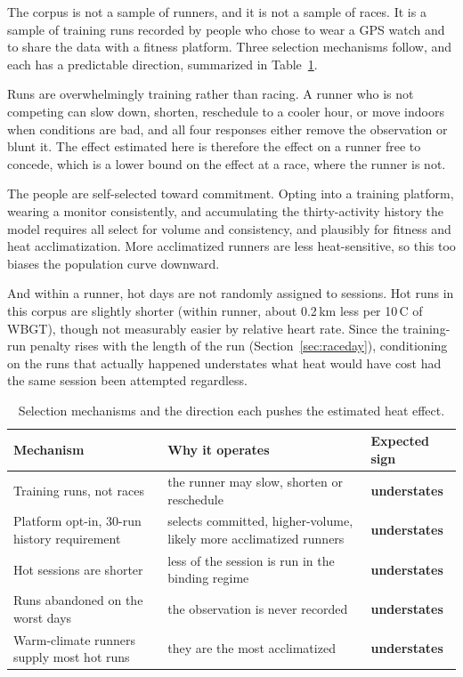 \documentclass[11pt]{article}
\renewcommand{\_}{\textunderscore\allowbreak}
\begin{document}
The corpus is not a sample of runners, and it is not a sample of races. It is a sample of training runs
recorded by people who chose to wear a GPS watch and to share the data with a fitness platform. Three
selection mechanisms follow, and each has a predictable direction, summarized in
Table~\ref{tab:selection}.

Runs are overwhelmingly training rather than racing. A runner who is not competing can slow down,
shorten, reschedule to a cooler hour, or move indoors when conditions are bad, and all four responses
either remove the observation or blunt it. The effect estimated here is therefore the effect on a runner
free to concede, which is a lower bound on the effect at a race, where the runner is not.

The people are self-selected toward commitment. Opting into a training platform, wearing a monitor
consistently, and accumulating the thirty-activity history the model requires all select for volume and
consistency, and plausibly for fitness and heat acclimatization. More acclimatized runners are less
heat-sensitive, so this too biases the population curve downward.

And within a runner, hot days are not randomly assigned to sessions. Hot runs in this corpus are
slightly shorter (within runner, about 0.2\,km less per 10\,\textdegree C of WBGT), though not measurably easier by relative heart rate. Since the training-run penalty rises with the length of the run
(Section~\ref{sec:raceday}), conditioning on the runs that actually happened understates what heat would
have cost had the same session been attempted regardless.

\begin{table}[!ht]
\centering\small
\caption{Selection mechanisms and the direction each pushes the estimated heat effect.}
\label{tab:selection}
\begin{tabular}{@{}p{5.2cm}p{4.8cm}p{3.2cm}@{}}
\toprule
Mechanism & Why it operates & Expected sign \\
\midrule
Training runs, not races & the runner may slow, shorten or reschedule & \textbf{understates} \\
Platform opt-in, 30-run history requirement & selects committed, higher-volume, likely more acclimatized runners & \textbf{understates} \\
Hot sessions are shorter & less of the session is run in the binding regime & \textbf{understates} \\
Runs abandoned on the worst days & the observation is never recorded & \textbf{understates} \\
Warm-climate runners supply most hot runs & they are the most acclimatized & \textbf{understates} \\
\bottomrule
\end{tabular}
\end{table}
\end{document}
